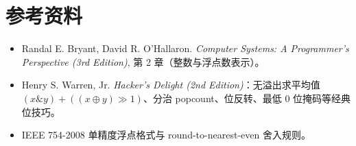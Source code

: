 \documentclass[11pt]{ctexart}
\begin{document}
\section{参考资料}
\begin{itemize}
  \item Randal E. Bryant, David R. O'Hallaron. \emph{Computer Systems: A Programmer's Perspective (3rd Edition)}, 第 2 章（整数与浮点数表示）。
  \item Henry S. Warren, Jr. \emph{Hacker's Delight (2nd Edition)}：无溢出求平均值 $(x\&y)+((x\oplus y)\gg 1)$、分治 popcount、位反转、最低 0 位掩码等经典位技巧。
  \item IEEE 754-2008 单精度浮点格式与 round-to-nearest-even 舍入规则。
\end{itemize}
\end{document}
